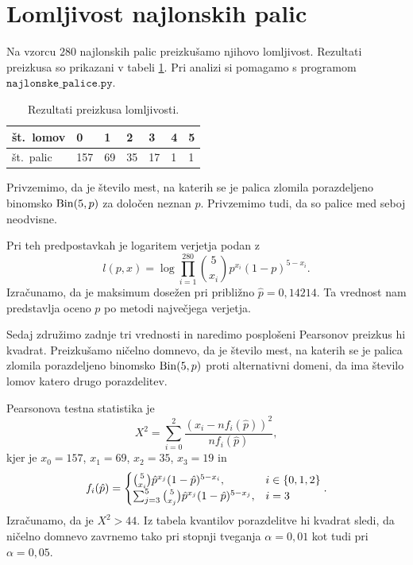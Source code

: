 \documentclass[12pt, a4paper]{article}
\begin{document}
\section{Lomljivost najlonskih palic}
Na vzorcu $280$ najlonskih palic preizkušamo njihovo lomljivost. Rezultati 
preizkusa so prikazani v tabeli \ref{table:lomljivost}. Pri analizi 
si pomagamo s programom $\texttt{najlonske\_palice.py}$.
\begin{table}[H]
    \centering
    \begin{tabular}{|l||l|l|l|l|l|l|}
        \hline
        št.~lomov & 0   & 1  & 2  & 3  & 4 & 5 \\ \hline
        št.~palic & 157 & 69 & 35 & 17 & 1 & 1 \\ \hline
    \end{tabular}
    \caption{Rezultati preizkusa lomljivosti.}
    \label{table:lomljivost}
\end{table}
Privzemimo, da je število mest, na katerih se je palica 
zlomila porazdeljeno binomsko $\operatorname{Bin}(5, p)$ za določen neznan $p$.
Privzemimo tudi, da so palice med seboj neodvisne.


Pri teh predpostavkah je logaritem verjetja podan z
\[
    l(p, x) = \log\prod_{i=1}^{280} \binom{5}{x_i}p^{x_i}(1-p)^{5-x_i}.
\]
Izračunamo, da je maksimum 
dosežen pri približno $\hat p = 0{,}14214$. Ta vrednost
nam predstavlja oceno $p$ po metodi največjega verjetja.


Sedaj združimo zadnje tri vrednosti in naredimo posplošeni 
Pearsonov preizkus hi kvadrat. Preizkušamo ničelno domnevo, da 
je število mest, na katerih se je palica zlomila porazdeljeno 
binomsko $\operatorname{Bin}(5, p)$ proti alternativni domeni, da ima število 
lomov katero drugo porazdelitev.

Pearsonova testna statistika je
\[
    X^2 = \sum_{i=0}^{2}\frac{(x_i - nf_i(\hat p))^2}{nf_i(\hat p)},
\]
kjer je $x_0 = 157$, $x_1 = 69$, $x_2 = 35$, $x_3 = 19$ in
\[
    f_i(\hat p) = \begin{cases}
        \binom{5}{x_i}\hat p^{x_j}(1-\hat p)^{5-x_i}, &i \in \left\{0,1,2\right\} \\
        \sum_{j=3}^{5} \binom{5}{x_j}\hat p^{x_j}(1-\hat p)^{5-x_j}, &i = 3 
    \end{cases}.
\]
Izračunamo, da je $X^2 > 44$. Iz tabela kvantilov porazdelitve 
hi kvadrat sledi, da ničelno domnevo zavrnemo tako 
pri stopnji tveganja $\alpha = 0{,}01$ kot tudi pri $\alpha = 0{,}05$. 
\end{document}
